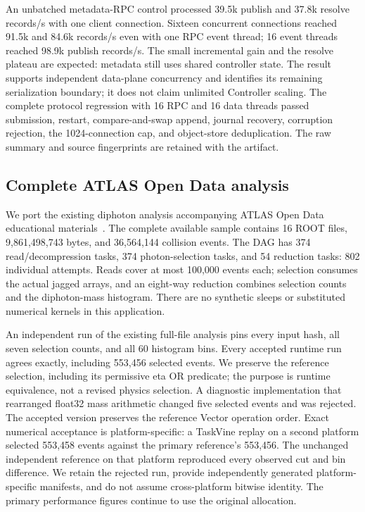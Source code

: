 An unbatched metadata-RPC control processed 39.5k publish and 37.8k resolve
records/s with one client connection. Sixteen concurrent connections reached
91.5k and 84.6k records/s even with one RPC event thread; 16 event threads
reached 98.9k publish records/s. The small incremental gain and the resolve
plateau are expected: metadata still uses shared controller state. The result
supports independent data-plane concurrency and identifies its remaining
serialization boundary; it does not claim unlimited Controller scaling.
The complete protocol regression with 16 RPC and 16 data threads passed
submission, restart, compare-and-swap append, journal recovery, corruption
rejection, the 1024-connection cap, and object-store deduplication.
The raw summary and source fingerprints are retained with the artifact.

\subsection{Complete ATLAS Open Data analysis}
We port the existing diphoton analysis accompanying ATLAS Open Data educational
materials~\cite{atlas-open-data}. The complete available sample contains 16
ROOT files, 9,861,498,743 bytes, and 36,564,144 collision events. The DAG has
374 read/decompression tasks, 374 photon-selection tasks, and 54 reduction
tasks: 802 individual attempts. Reads cover at most 100,000 events each;
selection consumes the actual jagged arrays, and an eight-way reduction
combines selection counts and the diphoton-mass histogram. There are no
synthetic sleeps or substituted numerical kernels in this application.

An independent run of the existing full-file analysis pins every input hash,
all seven selection counts, and all 60 histogram bins. Every accepted runtime
run agrees exactly, including 553,456 selected events. We preserve the reference
selection, including its permissive eta OR predicate; the purpose is runtime
equivalence, not a revised physics selection. A diagnostic implementation that
rearranged float32 mass arithmetic changed five selected events and was rejected.
The accepted version preserves the reference Vector operation order.
Exact numerical acceptance is platform-specific: a TaskVine replay on a second
platform selected 553,458 events against the primary reference's 553,456.
The unchanged independent reference on that platform reproduced every observed cut
and bin difference. We retain the rejected run, provide independently generated
platform-specific manifests, and do not assume cross-platform bitwise identity.
The primary performance figures continue to use the original allocation.

